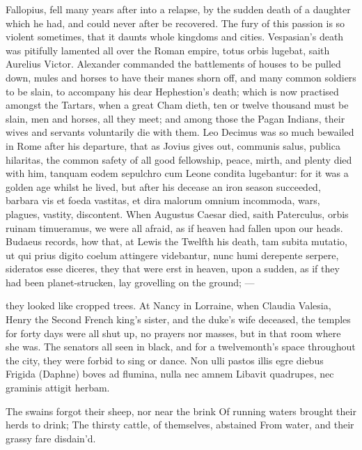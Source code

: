 {Fallopius, fell many years after into a relapse, by the sudden death of
a daughter which he had, and could never after be recovered. The fury
of this passion is so violent sometimes, that it daunts whole kingdoms
and cities. Vespasian's death was pitifully lamented all over the Roman
empire, totus orbis lugebat, saith Aurelius Victor. Alexander commanded
the battlements of houses to be pulled down, mules and horses to have
their manes shorn off, and many common soldiers to be slain, to
accompany his dear Hephestion's death; which is now practised amongst
the Tartars, when a great Cham dieth, ten or twelve thousand must
be slain, men and horses, all they meet; and among those the
Pagan Indians, their wives and servants voluntarily die with
them. Leo Decimus was so much bewailed in Rome after his departure,
that as Jovius gives out, communis salus, publica hilaritas, the
common safety of all good fellowship, peace, mirth, and plenty died
with him, tanquam eodem sepulchro cum Leone condita lugebantur: for it
was a golden age whilst he lived, but after his decease an iron
season succeeded, barbara vis et foeda vastitas, et dira malorum omnium
incommoda, wars, plagues, vastity, discontent. When Augustus Caesar
died, saith Paterculus, orbis ruinam timueramus, we were all afraid, as
if heaven had fallen upon our heads. Budaeus records, how that,
at Lewis the Twelfth his death, tam subita mutatio, ut qui prius digito
coelum attingere videbantur, nunc humi derepente serpere, sideratos
esse diceres, they that were erst in heaven, upon a sudden, as if they
had been planet-strucken, lay grovelling on the ground;
---

they looked like cropped trees. At Nancy in Lorraine, when
Claudia Valesia, Henry the Second French king's sister, and the duke's
wife deceased, the temples for forty days were all shut up, no prayers
nor masses, but in that room where she was. The senators all seen in
black, and for a twelvemonth's space throughout the city, they were
forbid to sing or dance.
Non ulli pastos illis egre diebus
Frigida (Daphne) boves ad flumina, nulla nec amnem
Libavit quadrupes, nec graminis attigit herbam.

The swains forgot their sheep, nor near the brink
Of running waters brought their herds to drink;
The thirsty cattle, of themselves, abstained
From water, and their grassy fare disdain'd.

}
